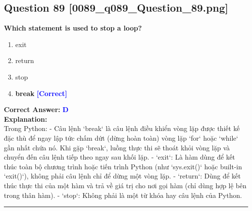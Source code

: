\documentclass[11pt,a4paper]{article}
\begin{document}
\begin{minipage}{\textwidth}
\subsection*{Question 89 \quad \footnotesize{[0089_q089_Question_89.png]}}
\noindent \textbf{Which statement is used to stop a loop?}

\begin{enumerate}[label=\Alph*.]
    \item exit
    \item return
    \item stop
    \item \textbf{break} \hfill \textcolor{blue}{\textbf{[Correct]}}
\end{enumerate}

\noindent \textbf{Correct Answer:} \textcolor{blue}{\textbf{D}} \\[4pt]
\noindent \textbf{Explanation:}\\
Trong Python:\newline
- Câu lệnh `break` là câu lệnh điều khiển vòng lặp được thiết kế đặc thù để ngay lập tức chấm dứt (dừng hoàn toàn) vòng lặp `for` hoặc `while` gần nhất chứa nó. Khi gặp `break`, luồng thực thi sẽ thoát khỏi vòng lặp và chuyển đến câu lệnh tiếp theo ngay sau khối lặp.\newline
- `exit`: Là hàm dùng để kết thúc toàn bộ chương trình hoặc tiến trình Python (như `sys.exit()` hoặc built-in `exit()`), không phải câu lệnh chỉ để dừng một vòng lặp.\newline
- `return`: Dùng để kết thúc thực thi của một hàm và trả về giá trị cho nơi gọi hàm (chỉ dùng hợp lệ bên trong thân hàm).\newline
- `stop`: Không phải là một từ khóa hay câu lệnh của Python.
\end{minipage}
\vspace{0.8cm}
\hrule
\vspace{0.5cm}
\end{document}
